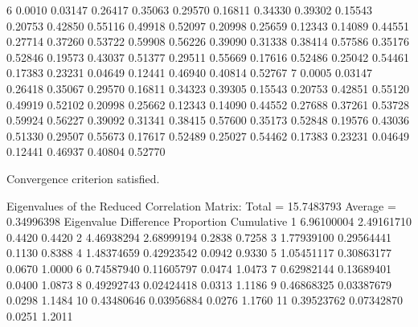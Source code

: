 \documentclass{article}
\begin{document}
\begin{Woutput}
    6      0.0010  0.03147  0.26417  0.35063  0.29570  0.16811  0.34330  0.39302  0.15543  0.20753
                   0.42850  0.55116  0.49918  0.52097  0.20998  0.25659  0.12343  0.14089  0.44551
                   0.27714  0.37260  0.53722  0.59908  0.56226  0.39090  0.31338  0.38414  0.57586
                   0.35176  0.52846  0.19573  0.43037  0.51377  0.29511  0.55669  0.17616  0.52486
                   0.25042  0.54461  0.17383  0.23231  0.04649  0.12441  0.46940  0.40814  0.52767
    7      0.0005  0.03147  0.26418  0.35067  0.29570  0.16811  0.34323  0.39305  0.15543  0.20753
                   0.42851  0.55120  0.49919  0.52102  0.20998  0.25662  0.12343  0.14090  0.44552
                   0.27688  0.37261  0.53728  0.59924  0.56227  0.39092  0.31341  0.38415  0.57600
                   0.35173  0.52848  0.19576  0.43036  0.51330  0.29507  0.55673  0.17617  0.52489
                   0.25027  0.54462  0.17383  0.23231  0.04649  0.12441  0.46937  0.40804  0.52770

Convergence criterion satisfied.

Eigenvalues of the Reduced Correlation Matrix: Total = 15.7483793  Average = 0.34996398
        Eigenvalue    Difference    Proportion    Cumulative
   1    6.96100004    2.49161710        0.4420        0.4420
   2    4.46938294    2.68999194        0.2838        0.7258
   3    1.77939100    0.29564441        0.1130        0.8388
   4    1.48374659    0.42923542        0.0942        0.9330
   5    1.05451117    0.30863177        0.0670        1.0000
   6    0.74587940    0.11605797        0.0474        1.0473
   7    0.62982144    0.13689401        0.0400        1.0873
   8    0.49292743    0.02424418        0.0313        1.1186
   9    0.46868325    0.03387679        0.0298        1.1484
  10    0.43480646    0.03956884        0.0276        1.1760
  11    0.39523762    0.07342870        0.0251        1.2011


\end{Woutput}
\end{document}
